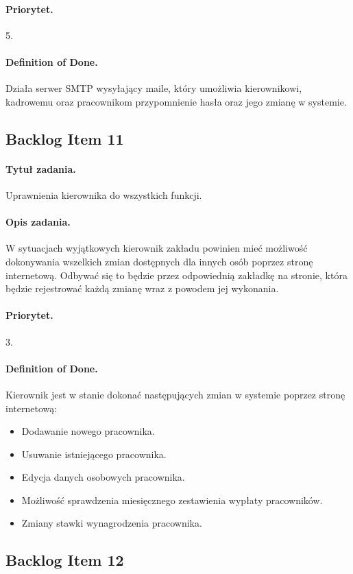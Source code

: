 \documentclass[a4paper]{article}
\begin{document}
\paragraph{Priorytet.} 5.
\paragraph{Definition of Done.} Działa serwer SMTP wysyłający maile, który umożliwia kierownikowi, kadrowemu oraz pracownikom przypomnienie hasła oraz jego zmianę w systemie.

\subsection{Backlog Item 11}
\paragraph{Tytuł zadania.} Uprawnienia kierownika do wszystkich funkcji.
\paragraph{Opis zadania.} W sytuacjach wyjątkowych kierownik zakładu powinien mieć możliwość dokonywania wszelkich zmian dostępnych dla innych osób poprzez stronę internetową. Odbywać się to będzie przez odpowiednią zakładkę na stronie, która będzie rejestrować każdą zmianę wraz z powodem jej wykonania.
\paragraph{Priorytet.} 3.
\paragraph{Definition of Done.} Kierownik jest w stanie dokonać następujących zmian w systemie poprzez stronę internetową:
\begin{itemize}
\item Dodawanie nowego pracownika.
\item Usuwanie istniejącego pracownika.
\item Edycja danych osobowych pracownika.
\item Możliwość sprawdzenia miesięcznego zestawienia wypłaty pracowników.
\item Zmiany stawki wynagrodzenia pracownika.
\end {itemize}

\subsection{Backlog Item 12}
\end{document}
